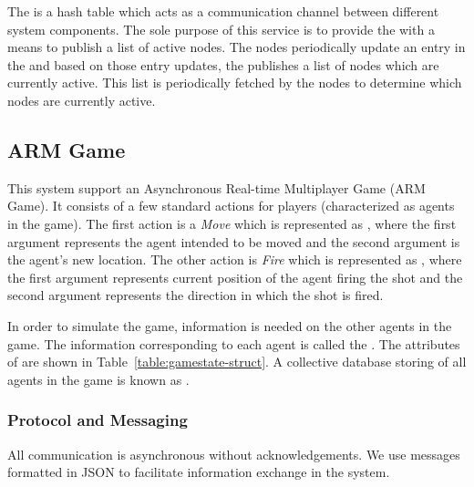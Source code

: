 	The \kvService is a hash table which acts as a communication channel between different system components. The sole purpose of this service is to provide the \activityServer with a means to publish a list of active nodes. The nodes periodically update an entry in the \kvService and based on those entry updates, the \activityServer publishes a list of nodes which are currently active. This list is periodically fetched by the nodes to determine which nodes are currently active.

\subsection{ARM Game}

	This system support an Asynchronous Real-time Multiplayer Game (ARM Game). It consists of a few standard actions for players (characterized as agents in the game). The first action is a \emph{Move} which is represented as \move{\agent}{\position}, where the first argument represents the agent intended to be moved and the second argument is the agent's new location. The other action is \emph{Fire} which is represented as \fire{\position}{\direction}, where the first argument represents current position of the agent firing the shot and the second argument represents the direction in which the shot is fired.
	
	In order to simulate the game, information is needed on the other agents in the game. The information corresponding to each agent is called the \agentstate. The attributes of \agentstate are shown in Table~\ref{table:gamestate-struct}. A collective database storing \agentstate of all agents in the game is known as \gamestate.  
	
	
\subsubsection{Protocol and Messaging}

 All communication is asynchronous without acknowledgements. We use messages formatted in JSON to facilitate information exchange in the system. 


	
